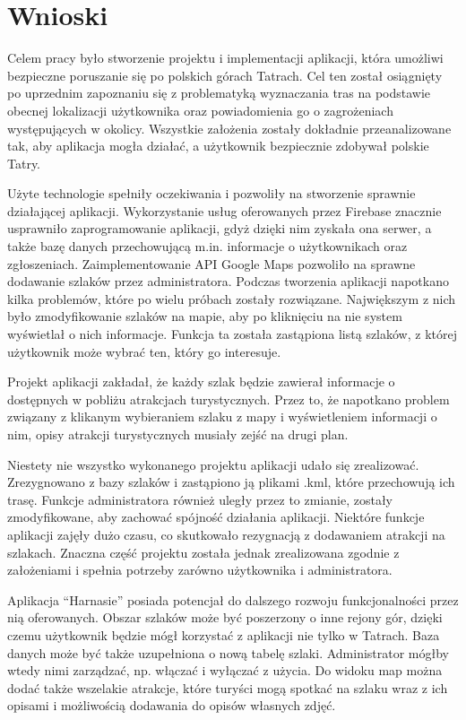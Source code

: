 \section{Wnioski} \label{wnioski}
Celem pracy było stworzenie projektu i implementacji aplikacji, która umożliwi bezpieczne poruszanie się po polskich górach Tatrach. Cel ten został osiągnięty po uprzednim zapoznaniu się z problematyką wyznaczania tras na podstawie obecnej lokalizacji użytkownika oraz powiadomienia go o zagrożeniach występujących w okolicy. Wszystkie założenia zostały dokładnie przeanalizowane tak, aby aplikacja mogła działać, a użytkownik bezpiecznie zdobywał polskie Tatry.

Użyte technologie spełniły oczekiwania i pozwoliły na stworzenie sprawnie działającej aplikacji. Wykorzystanie usług oferowanych przez Firebase znacznie usprawniło zaprogramowanie aplikacji, gdyż dzięki nim zyskała ona serwer, a także bazę danych przechowującą m.in. informacje o użytkownikach oraz zgłoszeniach. Zaimplementowanie API Google Maps pozwoliło na sprawne dodawanie szlaków przez administratora.
Podczas tworzenia aplikacji napotkano kilka problemów, które po wielu próbach zostały rozwiązane. Największym z nich było zmodyfikowanie szlaków na mapie, aby po kliknięciu na nie system wyświetlał o nich informacje. Funkcja ta została zastąpiona listą szlaków, z której użytkownik może wybrać ten, który go interesuje.

Projekt aplikacji zakładał, że każdy szlak będzie zawierał informacje o dostępnych w pobliżu atrakcjach turystycznych. Przez to, że napotkano problem związany z klikanym wybieraniem szlaku z mapy i wyświetleniem informacji o nim, opisy atrakcji turystycznych musiały zejść na drugi plan.

Niestety nie wszystko wykonanego projektu aplikacji udało się zrealizować. Zrezygnowano z bazy szlaków i zastąpiono ją plikami .kml, które przechowują ich trasę. Funkcje administratora również uległy przez to zmianie, zostały zmodyfikowane, aby zachować spójność działania aplikacji. Niektóre funkcje aplikacji zajęły dużo czasu, co skutkowało rezygnacją z dodawaniem atrakcji na szlakach. Znaczna część projektu została jednak zrealizowana zgodnie z założeniami i spełnia potrzeby zarówno użytkownika i administratora.

Aplikacja “Harnasie” posiada potencjał do dalszego rozwoju funkcjonalności przez nią oferowanych. Obszar szlaków może być poszerzony o inne rejony gór, dzięki czemu użytkownik będzie mógł korzystać z aplikacji nie tylko w Tatrach. Baza danych może być także uzupełniona o nową tabelę szlaki. Administrator mógłby wtedy nimi zarządzać, np. włączać i wyłączać z użycia. Do widoku map można dodać także wszelakie atrakcje, które turyści mogą spotkać na szlaku wraz z ich opisami i możliwością dodawania do opisów własnych zdjęć.

